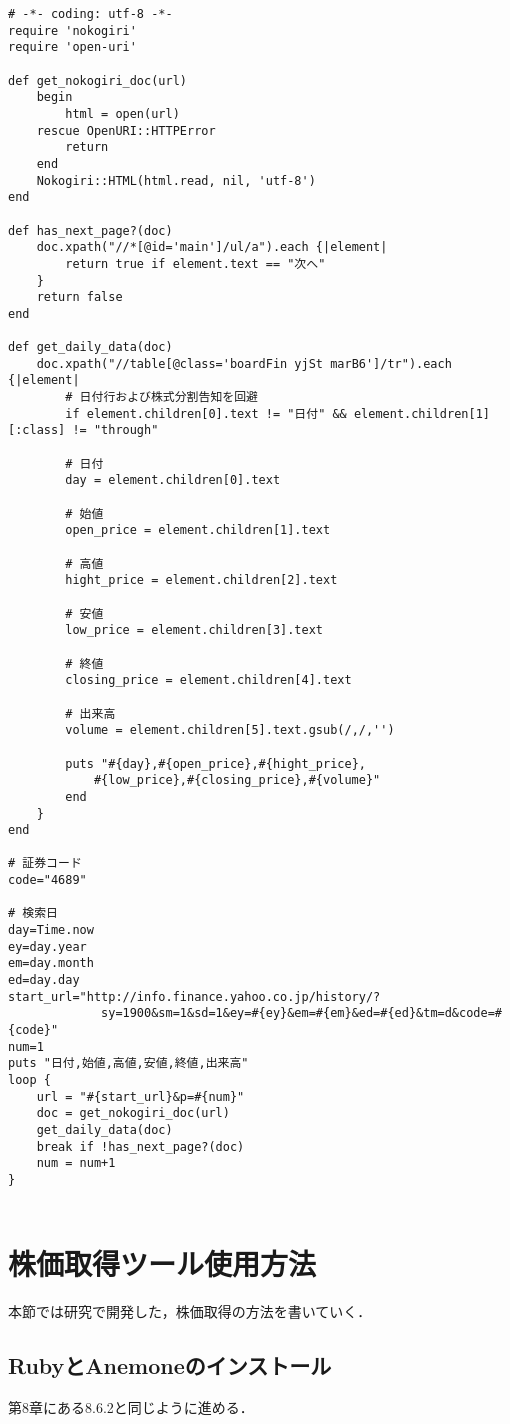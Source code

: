\begin{lstlisting}
# -*- coding: utf-8 -*-
require 'nokogiri'
require 'open-uri'

def get_nokogiri_doc(url)
	begin
		html = open(url)
	rescue OpenURI::HTTPError
		return
	end
	Nokogiri::HTML(html.read, nil, 'utf-8')
end

def has_next_page?(doc)
	doc.xpath("//*[@id='main']/ul/a").each {|element|
		return true if element.text == "次へ"
	}
	return false
end

def get_daily_data(doc)
	doc.xpath("//table[@class='boardFin yjSt marB6']/tr").each {|element|
		# 日付行および株式分割告知を回避
		if element.children[0].text != "日付" && element.children[1][:class] != "through"

		# 日付
		day = element.children[0].text

		# 始値
		open_price = element.children[1].text

		# 高値
		hight_price = element.children[2].text

		# 安値
		low_price = element.children[3].text

		# 終値
		closing_price = element.children[4].text

		# 出来高
		volume = element.children[5].text.gsub(/,/,'')

		puts "#{day},#{open_price},#{hight_price},
			#{low_price},#{closing_price},#{volume}"
		end
	}
end

# 証券コード
code="4689"

# 検索日
day=Time.now
ey=day.year
em=day.month
ed=day.day
start_url="http://info.finance.yahoo.co.jp/history/?
             sy=1900&sm=1&sd=1&ey=#{ey}&em=#{em}&ed=#{ed}&tm=d&code=#{code}"
num=1
puts "日付,始値,高値,安値,終値,出来高"
loop {
	url = "#{start_url}&p=#{num}"
	doc = get_nokogiri_doc(url)
	get_daily_data(doc)
	break if !has_next_page?(doc)
	num = num+1
}
		
\end{lstlisting}


\section{株価取得ツール使用方法}
本節では研究で開発した，株価取得の方法を書いていく．


\subsection{RubyとAnemoneのインストール}
第8章にある8.6.2と同じように進める．

